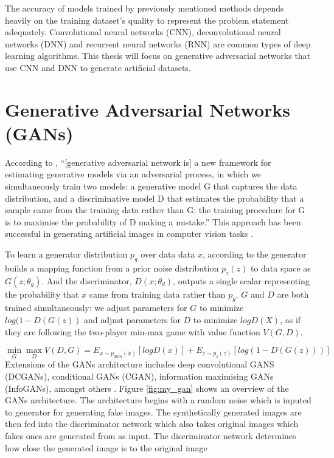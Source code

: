 The accuracy of models trained by previously mentioned methods depends heavily on the training dataset’s quality to represent the problem statement adequately. Convolutional neural networks (CNN), deconvolutional neural networks (DNN) and recurrent neural networks (RNN) are common types of deep learning algorithms. This thesis will focus on generative adversarial networks that use CNN and DNN to generate artificial datasets. 

\section{Generative Adversarial Networks (GANs)}
According to \cite{goodfellow2014generative}, “[generative adversarial network is] a new framework for estimating generative models via an adversarial process, in which we simultaneously train two models: a generative model G that captures the data distribution, and a discriminative model D that estimates the probability that a sample came from the training data rather than G; the training procedure for G is to maximise the probability of D making a mistake.” This approach has been successful in generating artificial images in computer vision tasks \cite{denton2015deep}.

To learn a generator distribution $p_g$ over data data $x$, according to \cite{mirza2014conditional} the generator builds a mapping function from a prior noise distribution $p_z(z)$ to data space as $G(z; \theta_g)$. And the discriminator, $D(x; \theta_d)$, outputs a single scalar representing the probability that $x$ came from training data rather than $p_g$. $G$ and $D$ are both trained simultaneously: we adjust parameters for $G$ to minimize $log(1-D(G(z))$ and adjust parameters for $D$ to minimize $logD(X)$, as if they are following the two-player min-max game with value function $V (G, D)$.

\begin{equation} \label{gan_eqn}
\min_G \max_D V(D,G) = E_{x\sim p_{data}(x)}[logD(x)] + E_{z\sim p_z(z)}[log(1-D(G(z)))]
\end{equation}
 Extensions of the GANs architecture includes deep convolutional GANS (DCGANs), conditional GANs (CGAN), information maximising GANs (InfoGANs), amongst others \cite{radford2015unsupervised,chen2016infogan,mirza2014conditional}. Figure \ref{fig:my_gan} shows an overview of the GANs architecture. The architecture begins with a random noise which is inputed to generator for generating fake images. The synthetically generated images are then fed into the discriminator network which also takes original images which fakes ones are generated from as input. The discriminator network determines how close the generated image is to the original image

